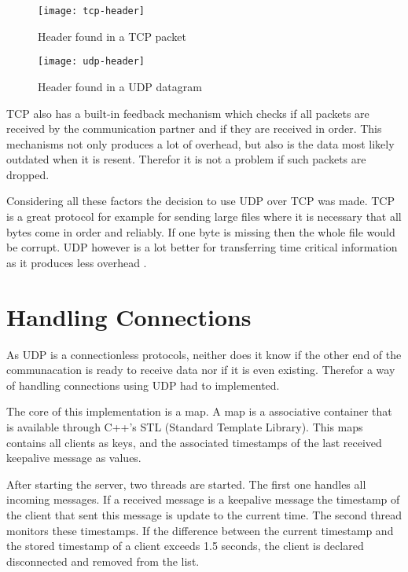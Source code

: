 \begin{figure}[H]
    \centering
    \texttt{[image: tcp-header]}
    \caption{Header found in a TCP packet}
    \label{fig:tcp-header}
\end{figure}

\begin{figure}[H]
    \centering
    \texttt{[image: udp-header]}
    \caption{Header found in a UDP datagram}
    \label{fig:udp-header}
\end{figure}

TCP also has a built-in feedback mechanism which checks if all packets are received by the communication partner and if they are received in order. This mechanisms not only produces a lot of overhead, but also is the data
most likely outdated when it is resent. Therefor it is not a problem if such packets are dropped.

Considering all these factors the decision to use UDP over TCP was made. TCP is a great protocol for example for sending large files where it is necessary that all bytes come in order and reliably. If one byte is missing
then the whole file would be corrupt. UDP however is a lot better for transferring time critical information as it produces less overhead \autocite{TCPUDPRTlifesize}.

\section {Handling Connections}

As UDP is a connectionless protocols, neither does it know if the other end of the communacation is ready to receive data nor if it is even existing. Therefor a way of handling connections using UDP had to implemented.

The core of this implementation is a map. A map is a associative container that is available through C++'s STL (Standard Template Library). This maps contains all clients as keys, and the associated timestamps of the last
received keepalive message as values.

After starting the server, two threads are started. The first one handles all incoming messages. If a received message is a keepalive message the timestamp of the client that sent this message is update
to the current time. The second thread monitors these timestamps. If the difference between the current timestamp and the stored timestamp of a client exceeds 1.5 seconds, the client is declared disconnected and removed
from the list.


